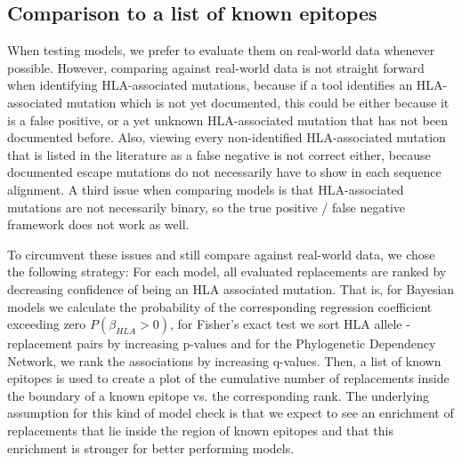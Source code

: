 \documentclass[fleqn,11pt]{SelfArx} %
\begin{document}
\subsection*{Comparison to a list of known epitopes}

When testing models, we prefer to evaluate them on real-world data whenever possible. 
However, comparing against real-world data is not straight forward when identifying HLA-associated mutations, because if a tool identifies an HLA-associated mutation which is not yet documented, this could be either because it is a false positive, or a yet unknown HLA-associated mutation that has not been documented before. 
Also, viewing every non-identified HLA-associated mutation that is listed in the literature as a false negative is not correct either, because documented escape mutations do not necessarily have to show in each sequence alignment.
A third issue when comparing models is that HLA-associated mutations are not necessarily binary, so the true positive / false negative framework does not work as well.

To circumvent these issues and still compare against real-world data, we chose the following strategy:
For each model, all evaluated replacements are ranked by decreasing confidence of being an HLA associated mutation. That is, for Bayesian models we calculate the probability of the corresponding regression coefficient exceeding zero \(P(\beta_{HLA} > 0)\), for Fisher's exact test we sort HLA allele - replacement pairs by increasing p-values and for the Phylogenetic Dependency Network, we rank the associations by increasing q-values.
Then, a list of known epitopes is used to create a plot of the cumulative number of replacements inside the boundary of a known epitope vs. the corresponding rank. The underlying assumption for this kind of model check is that we expect to see an enrichment of replacements that lie inside the region of known epitopes and that this enrichment is stronger for better performing models.
\end{document}
